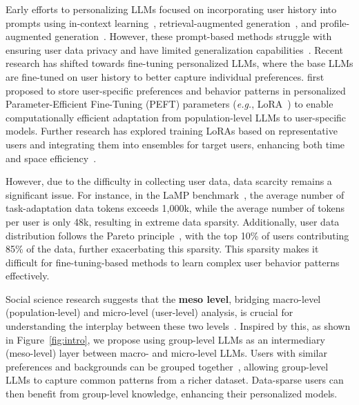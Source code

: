\documentclass[11pt]{article}
\begin{document}
Early efforts to personalizing LLMs focused on incorporating user history into prompts using in-context learning~\cite{dai2023uncovering}, retrieval-augmented generation~\cite{mysore-etal-2024-pearl}, and profile-augmented generation~\cite{richardson2023integrating}. 
However, these prompt-based methods struggle with ensuring user data privacy and have limited generalization capabilities~\cite{tan-etal-2024-democratizing}. 
Recent research has shifted towards fine-tuning personalized LLMs, where the base LLMs are fine-tuned on user history to better capture individual preferences.
\citet{tan-etal-2024-democratizing} first proposed to store user-specific preferences and behavior patterns in personalized Parameter-Efficient Fine-Tuning (PEFT) parameters (\textit{e.g.}, LoRA~\cite{hu2022lora}) to enable computationally efficient adaptation from population-level LLMs to user-specific models.
Further research has explored training LoRAs based on representative users and integrating them into ensembles for target users, enhancing both time and space efficiency~\cite{tan-etal-2024-personalized}.

However, due to the difficulty in collecting user data, data scarcity remains a significant issue. 
For instance, in the LaMP benchmark~\cite{salemi-etal-2024-lamp}, the average number of task-adaptation data tokens exceeds 1,000k, while the average number of tokens per user is only 48k, resulting in extreme data sparsity. 
Additionally, user data distribution follows the Pareto principle~\cite{backhaus1980pareto}, with the top 10\% of users contributing 85\% of the data, further exacerbating this sparsity.
This sparsity makes it difficult for fine-tuning-based methods to learn complex user behavior patterns effectively.

Social science research suggests that the \textbf{meso level}, bridging macro-level (population-level) and micro-level (user-level) analysis, is crucial for understanding the interplay between these two levels~\cite{mcconnell2002meeting,fine2012group,faist2021crucial}. 
Inspired by this, as shown in Figure~\ref{fig:intro}, we propose using group-level LLMs as an intermediary (meso-level) layer between macro- and micro-level LLMs. 
Users with similar preferences and backgrounds can be grouped together~\cite{wood1989theory}, allowing group-level LLMs to capture common patterns from a richer dataset. 
Data-sparse users can then benefit from group-level knowledge, enhancing their personalized models. 
\end{document}
